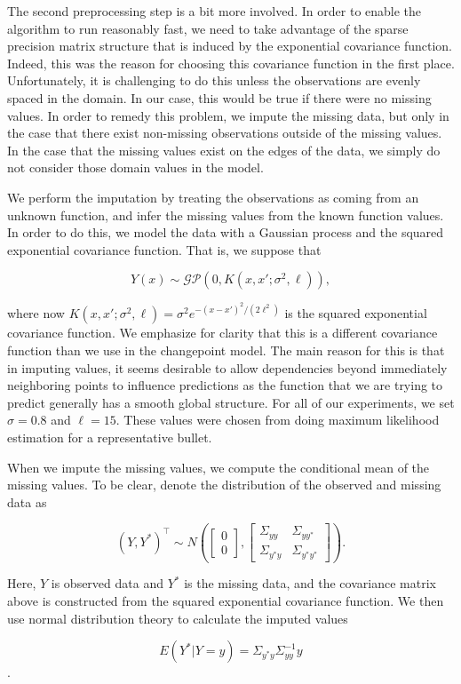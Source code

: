 \documentclass[12pt]{article}
\begin{document}
The second preprocessing step is a bit more involved. In order to enable
the algorithm to run reasonably fast, we need to take advantage of the
sparse precision matrix structure that is induced by the exponential
covariance function. Indeed, this was the reason for choosing this
covariance function in the first place. Unfortunately, it is challenging
to do this unless the observations are evenly spaced in the domain. In
our case, this would be true if there were no missing values. In order
to remedy this problem, we impute the missing data, but only in the case
that there exist non-missing observations outside of the missing values.
In the case that the missing values exist on the edges of the data, we
simply do not consider those domain values in the model.

We perform the imputation by treating the observations as coming from an
unknown function, and infer the missing values from the known function
values. In order to do this, we model the data with a Gaussian process
and the squared exponential covariance function. That is, we suppose
that

\[
Y(x) \sim \mathcal{GP}(0, K(x,x';\sigma^2, \ell)),
\]

\noindent where now
\(K(x,x';\sigma^2, \ell) = \sigma^2 e^{-(x - x')^2/(2\ell^2)}\) is the
squared exponential covariance function. We emphasize for clarity that
this is a different covariance function than we use in the changepoint
model. The main reason for this is that in imputing values, it seems
desirable to allow dependencies beyond immediately neighboring points to
influence predictions as the function that we are trying to predict
generally has a smooth global structure. For all of our experiments, we
set \(\sigma = 0.8\) and \(\ell = 15\). These values were chosen from
doing maximum likelihood estimation for a representative bullet.

When we impute the missing values, we compute the conditional mean of
the missing values. To be clear, denote the distribution of the observed
and missing data as

\[ 
(Y,Y^*)^\top \sim N\left( \begin{bmatrix} 0 \\ 0 \end{bmatrix}, \begin{bmatrix} \Sigma_{yy} & \Sigma_{yy^*} \\ \Sigma_{y^*y} & \Sigma_{y^*y^*}\end{bmatrix} \right).
\]

\noindent Here, \(Y\) is observed data and \(Y^*\) is the missing data,
and the covariance matrix above is constructed from the squared
exponential covariance function. We then use normal distribution theory
to calculate the imputed values

\[ E(Y^*|Y = y) = \Sigma_{y^*y} \Sigma_{yy}^{-1}y \].



\end{document}
